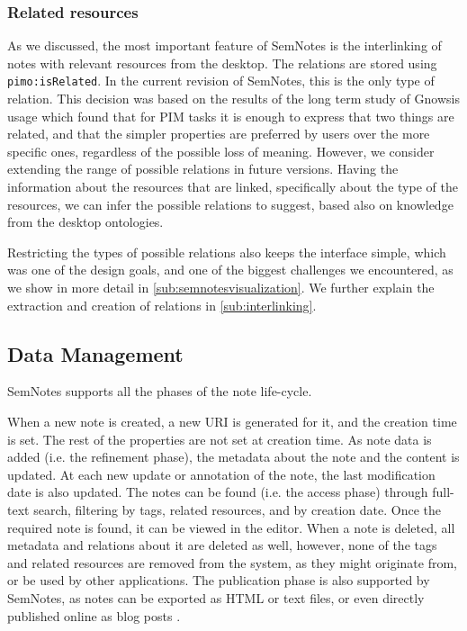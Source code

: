 \subsubsection{Related resources}
 
As we discussed, the most important feature of SemNotes is the interlinking of notes with relevant resources from the desktop. The relations are stored using \verb|pimo:isRelated|. In the current revision of SemNotes, this is the only type of relation. This decision was based on the results of the long term study of Gnowsis usage \cite{Sauermann2008} which found that for PIM tasks it is enough to express that two things are related, and that the simpler properties are preferred by users over the more specific ones, regardless of the possible loss of meaning. However, we consider extending the range of possible relations in future versions. Having the information about the resources that are linked, specifically about the type of the resources, we can infer the possible relations to suggest, based also on knowledge from the desktop ontologies. 

Restricting the types of possible relations also keeps the interface simple, which was one of the design goals, and one of the biggest challenges we encountered, as we show in more detail in \ref{sub:semnotesvisualization}. We further explain the extraction and creation of relations in \ref{sub:interlinking}.

\subsection{Data Management}
\label{sub:datamanagement}

SemNotes supports all the phases of the note life-cycle.

When a new note is created, a new URI is generated for it, and the creation time is set. The rest of the properties are not set at creation time. As note data is added (i.e. the refinement phase), the metadata about the note and the content is updated. At each new update or annotation of the note, the last modification date is also updated. The notes can be found (i.e. the access phase) through full-text search, filtering by tags, related resources, and by creation date. Once the required note is found, it can be viewed in the editor. When a note is deleted, all metadata and relations about it are deleted as well, however, none of the tags and related resources are removed from the system, as they might originate from, or be used by other applications. The publication phase is also supported by SemNotes, as notes can be exported as HTML or text files, or even directly published online as blog posts \cite{Dragan2010a}.


